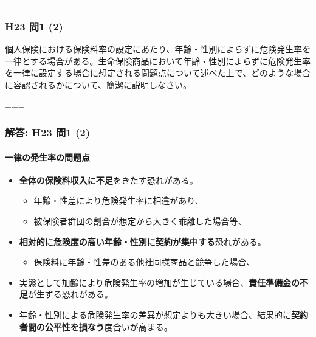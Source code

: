 \documentclass[
]{article}
\providecommand{\tightlist}{%
  \setlength{\itemsep}{0pt}\setlength{\parskip}{0pt}}
\begin{document}
\begin{center}\rule{0.5\linewidth}{0.5pt}\end{center}

\hypertarget{h23-ux554f1-2}{%
\subsubsection{H23 問1 (2)}\label{h23-ux554f1-2}}

個人保険における保険料率の設定にあたり、年齢・性別によらずに危険発生率を一律とする場合がある。生命保険商品において年齢・性別によらずに危険発生率を一律に設定する場合に想定される問題点について述べた上で、どのような場合に容認されるかについて、簡潔に説明しなさい。

===

\hypertarget{ux89e3ux7b54-h23-ux554f1-2}{%
\subsubsection{解答: H23 問1 (2)}\label{ux89e3ux7b54-h23-ux554f1-2}}

\hypertarget{ux4e00ux5f8bux306eux767aux751fux7387ux306eux554fux984cux70b9}{%
\paragraph{一律の発生率の問題点}\label{ux4e00ux5f8bux306eux767aux751fux7387ux306eux554fux984cux70b9}}

\begin{itemize}
\tightlist
\item
  \textbf{全体の保険料収入に不足}をきたす恐れがある。

  \begin{itemize}
  \tightlist
  \item
    年齢・性差により危険発生率に相違があり、
  \item
    被保険者群団の割合が想定から大きく乖離した場合等、
  \end{itemize}
\item
  \textbf{相対的に危険度の高い年齢・性別に契約が集中する}恐れがある。

  \begin{itemize}
  \tightlist
  \item
    保険料に年齢・性差のある他社同様商品と競争した場合、
  \end{itemize}
\item
  実態として加齢により危険発生率の増加が生じている場合、\textbf{責任準備金の不足}が生ずる恐れがある。
\item
  年齢・性別による危険発生率の差異が想定よりも大きい場合、結果的に\textbf{契約者間の公平性を損なう}度合いが高まる。
\end{itemize}
\end{document}

